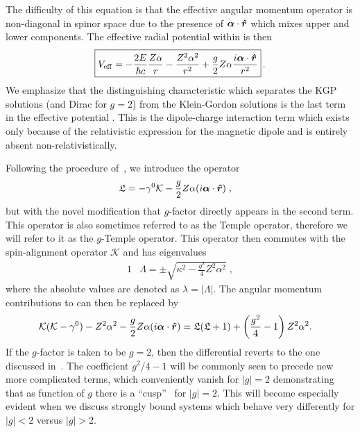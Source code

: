 The difficulty of this equation is that the effective angular momentum operator is non-diagonal in spinor space due to the presence of $\boldsymbol{\alpha}\cdot\boldsymbol{\hat{r}}$ which mixes upper and lower components. The effective radial potential within  is then
\begin{alignat}{1}
	\label{temp} \boxed{V_\mathrm{eff}=-\frac{2E}{\hbar c}\frac{Z\alpha}{r}-\frac{Z^{2}\alpha^{2}}{r^{2}}+\frac{g}{2}Z\alpha\frac{i\boldsymbol{\alpha}\cdot\boldsymbol{\hat{r}}}{r^{2}}}\,.
\end{alignat}
We emphasize that the distinguishing characteristic which separates the KGP solutions (and Dirac for $g\!=\!2$) from the Klein-Gordon solutions is the last term in the effective potential . This is the dipole-charge interaction term which exists only because of the relativistic expression for the magnetic dipole and is entirely absent non-relativistically. 

Following the procedure of~\cite{Martin:1958zz}, we introduce the operator
\begin{alignat}{1}
\label{cou07} &\mathfrak{L}=-\gamma^{0}\mathcal{K}-\frac{g}{2}Z\alpha(i\boldsymbol{\alpha}\cdot\boldsymbol{\hat{r}})\;,
\end{alignat}
but with the novel modification that $g$-factor directly appears in the second term. This operator is also sometimes referred to as the Temple operator, therefore we will refer to it as the $g$-Temple operator. This operator then commutes with the spin-alignment operator $\mathcal{K}$ and has eigenvalues
\begin{alignat}{1}
\label{cou08} &\Lambda=\pm\sqrt{\kappa^{2}-\displaystyle\frac{\displaystyle g^{2}}{4}Z^{2}\alpha^{2}}\;,\end{alignat}
where the absolute values are denoted as $\lambda=|\Lambda|$. The angular momentum contributions to  can then be replaced by
\begin{alignat}{1}
\label{cou09} &\mathcal{K}(\mathcal{K}-\gamma^{0})-Z^{2}\alpha^{2}-\frac{g}{2}Z\alpha(i\boldsymbol{\alpha}\cdot\boldsymbol{\hat{r}})=\mathfrak{L}(\mathfrak{L}+1)+\left(\frac{g^{2}}{4}-1\right)Z^{2}\alpha^{2}.
\end{alignat}
If the $g$-factor is taken to be $g\!=\!2$, then the differential  reverts to the one discussed in~\cite{Martin:1958zz}. The coefficient $g^{2}/4-1$ will be commonly seen to precede new more complicated terms, which conveniently vanish for $|g|=2$ demonstrating that as function of $g$ there is a ``cusp''~\citep{Rafelski:2022bsv} for $|g|=2$. This will become especially evident when we discuss strongly bound systems which behave very differently for $|g|<2$ versus $|g|>2$. 

